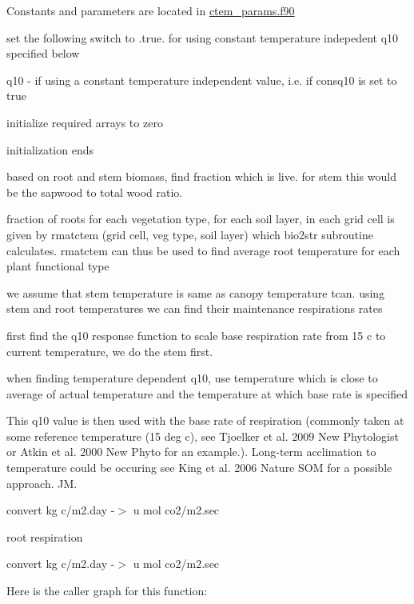  Constants and parameters are located in \hyperlink{ctem__params_8f90}{ctem\+\_\+params.\+f90}

set the following switch to .true. for using constant temperature indepedent q10 specified below

q10 -\/ if using a constant temperature independent value, i.\+e. if consq10 is set to true





initialize required arrays to zero

initialization ends

based on root and stem biomass, find fraction which is live. for stem this would be the sapwood to total wood ratio.

fraction of roots for each vegetation type, for each soil layer, in each grid cell is given by rmatctem (grid cell, veg type, soil layer) which bio2str subroutine calculates. rmatctem can thus be used to find average root temperature for each plant functional type

we assume that stem temperature is same as canopy temperature tcan. using stem and root temperatures we can find their maintenance respirations rates

first find the q10 response function to scale base respiration rate from 15 c to current temperature, we do the stem first.

when finding temperature dependent q10, use temperature which is close to average of actual temperature and the temperature at which base rate is specified

This q10 value is then used with the base rate of respiration (commonly taken at some reference temperature (15 deg c), see Tjoelker et al. 2009 New Phytologist or Atkin et al. 2000 New Phyto for an example.). Long-\/term acclimation to temperature could be occuring see King et al. 2006 Nature S\+O\+M for a possible approach. J\+M.

convert kg c/m2.\+day -\/$>$ u mol co2/m2.\+sec

root respiration

convert kg c/m2.\+day -\/$>$ u mol co2/m2.\+sec 

Here is the caller graph for this function\+:


